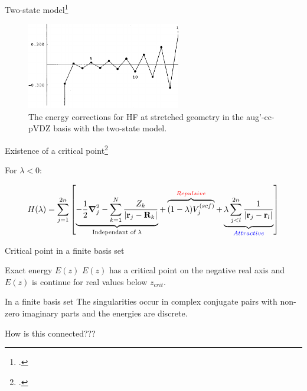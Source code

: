 \documentclass[xcolor=x11names,compress]{beamer}
\renewcommand{\(}{\begin{columns}}
\renewcommand{\)}{\end{columns}}
\newcommand{\<}[1]{\begin{column}{#1}}
\renewcommand{\>}{\end{column}}
\begin{document}
\begin{frame}{Two-state model\footcite{olsen_divergence_2000}}
  
\begin{figure}
    \centering
    \includegraphics[width=0.6\textwidth]{figure-fig14.png}
    \caption{\centering The energy corrections for HF at stretched geometry in the aug'-cc-pVDZ basis with the two-state model.}
    \label{fig:my_label}
\end{figure}

\end{frame}

\begin{frame}{Existence of a critical point\footcite{stillinger_mollerplesset_2000}}

For $\lambda<0$:

\begin{equation*}
    H(\lambda)=\sum\limits_{j=1}^{2n}\left[ \underbrace{-\frac{1}{2}\grad_j^2 - \sum\limits_{k=1}^{N} \frac{Z_k}{|\vb{r}_j-\vb{R}_k|}}_{\text{Independant of }\lambda} + \overbrace{(1-\lambda)V_j^{(scf)}}^{\textcolor{red}{Repulsive}}+\underbrace{\lambda\sum\limits_{j<l}^{2n}\frac{1}{|\vb{r}_j-\vb{r}_l|}}_{\textcolor{blue}{Attractive}}  \right]
\end{equation*}

\end{frame}

\begin{frame}{Critical point in a finite basis set}

\pause[1]
    
\begin{beamerboxesrounded}[scheme=foncé]{\centering Exact energy $E(z)$}
$E(z)$ has a critical point on the negative real axis and $E(z)$ is continue for real values below $z_{crit}$.
\end{beamerboxesrounded}

\vspace{0.5cm}

\pause[2]

\begin{beamerboxesrounded}[scheme=foncé]{\centering In a finite basis set}
The singularities occur in complex conjugate pairs with non-zero imaginary parts and the energies are discrete. 
\end{beamerboxesrounded}

\vspace{0.5cm}

\pause[3]

\centering \Large{How is this connected???}
    
\end{frame}
\end{document}

